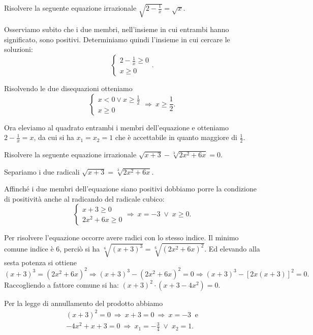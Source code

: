 \begin{exrig}
\begin{esempio}
Risolvere la seguente equazione irrazionale $\sqrt{2-\frac 1 x}=\sqrt x$.

Osserviamo subito che i due membri, nell'insieme in cui entrambi hanno significato, sono positivi.
Determiniamo quindi l'insieme in cui cercare le soluzioni: 
\[\left\{\begin{array}{l}{2-\frac 1 x\ge 0}\\{x\ge 0}\end{array}\right..\]

Risolvendo le due disequazioni otteniamo 
\[\left\{\begin{array}{l}x<0\vee x\ge \frac 1 2\\{x\ge 0}\end{array}\right.\Rightarrow\: x\ge \frac 1 2.\]

Ora eleviamo al quadrato entrambi i membri dell'equazione e otteniamo $2-\frac 1 x=x$, da cui si ha $x_1=x_2=1$ che è accettabile in quanto maggiore di $\frac 1 2$.
\end{esempio}
\begin{esempio}
Risolvere la seguente equazione irrazionale $\sqrt{x+3}-\sqrt[3]{2x^2+6x}=0$.

Separiamo i due radicali $\sqrt{x+3}=\sqrt[3]{2x^2+6x}$.

Affinché i due membri dell'equazione siano positivi dobbiamo porre la condizione di positività anche al radicando del radicale cubico: 
\[\left\{\begin{array}{l}{x+3\ge 0}\\{2x^2+6x\ge 0}\end{array}\right.\Rightarrow\: x=-3\;\vee\; x\ge 0.\]

Per risolvere l'equazione occorre avere radici con lo stesso indice. Il minimo comune indice è $6$, perciò si ha $\sqrt[6]{(x+3)^3}=\sqrt[6]{\left(2x^2+6x\right)^2}$. Ed elevando alla sesta potenza si ottiene
\[(x+3)^3=\left(2x^2+6x\right)^2 \Rightarrow (x+3)^3-\left(2x^2+6x\right)^2=0 \Rightarrow (x+3)^3-[2x(x+3)]^2=0.\]
Raccogliendo a fattore comune si ha: $(x+3)^2\cdot \left(x+3-4x^2\right)=0$.

Per la legge di annullamento del prodotto abbiamo 
\[\begin{array}{l}(x+3)^2=0\:\Rightarrow\: x+3=0\:\Rightarrow\: x=-3~\text{ e} \\-4x^2+x+3=0\:\Rightarrow\:x_1=-\frac 3 4\;\vee\; x_2=1.\end{array}\]


\end{esempio}
\end{exrig}
